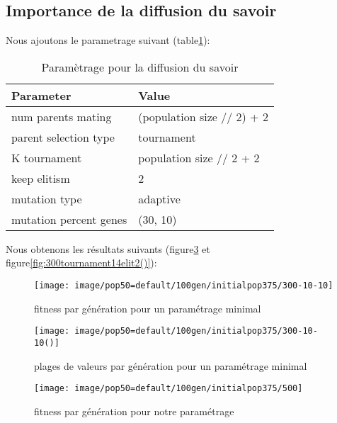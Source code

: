 \documentclass[journal, a4paper]{IEEEtran}
\begin{document}
\subsection{Importance de la diffusion du savoir}
	Nous ajoutons le parametrage suivant (table\ref{tab:simParameters}):
	\begin{table}[!hbt]
		\begin{center}
		\caption{Paramètrage pour la diffusion du savoir}
		\label{tab:simParameters}
		\begin{tabular}{|l|l|}
			\hline
			\textbf{Parameter} & \textbf{Value} \\
			\hline
			num parents mating & (population size // 2) + 2 \\
			\hline
			parent selection type & tournament \\
			\hline
			K tournament & population size // 2 + 2 \\
			\hline
			keep elitism & 2 \\
			\hline
			mutation type & adaptive \\
			\hline
			mutation percent genes & (30, 10) \\
			\hline
			\end{tabular}
		\end{center}
	\end{table}


	Nous obtenons les résultats suivants (figure\ref{fig:300tournament14elit2} et figure\ref{fig:300tournament14elit2()}):
\begin{figure}[!hbt]
  \centering
  \texttt{[image: image/pop50=default/100gen/initialpop375/300-10-10]}
  \caption{fitness par génération pour un paramétrage minimal}
  \label{fig:parameter_minimum_requis}
\end{figure}

\begin{figure}[!hbt]
  \centering
  \texttt{[image: image/pop50=default/100gen/initialpop375/300-10-10()]}
  \caption{plages de valeurs par génération pour un paramétrage minimal}
  \label{fig:parameter_minimum_requis2}
\end{figure}

\begin{figure}[!hbt]
  \texttt{[image: image/pop50=default/100gen/initialpop375/500]}
  \caption{fitness par génération pour notre paramétrage}
  \label{fig:300tournament14elit2}
\end{figure}
\end{document}
